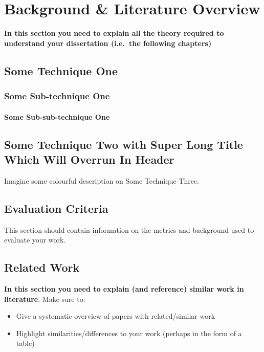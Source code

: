 \chapter{Background \& Literature Overview}
\textbf{In this section you need to explain all the theory required to understand your dissertation (i.e.\ the following chapters)}
\section{Some Technique One}
\blindtext
\subsection{Some Sub-technique One}
\blindtext
{}
\blindtext
\subsubsection{Some Sub-sub-technique One}
\blindtext
{}
\blindtext
{}

\section[Some Technique Two]{Some Technique Two with Super Long Title Which Will Overrun In Header}
\blindtext[5]

Imagine some colourful description on Some Technique Three.


\section{Evaluation Criteria}
This section should contain information on the metrics and background used to evaluate your work.

\section{Related Work}
\textbf{In this section you need to explain (and reference) similar work in literature}.  Make sure to:

\begin{itemize}
 \item Give a systematic overview of papers with related/similar work
 \item Highlight similarities/differences to your work (perhaps in the form of a table)
\end{itemize}

